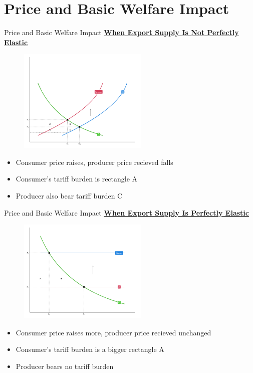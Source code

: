 \documentclass{beamer}
\begin{document}
\section{Price and Basic Welfare Impact}
\begin{frame}{Price and Basic Welfare Impact}
    \underline{\textbf{When Export Supply Is {\color{red}Not} Perfectly Elastic}}
    \begin{figure}[H]
        \centering
        \includegraphics[width=0.55\textwidth]{tariff_welfare.png}
    \end{figure}
    \begin{itemize}
        \item Consumer price {\color{red}raises,} producer price recieved {\color{red}falls}
        \item Consumer's tariff burden is rectangle A
        \item {\color{red}Producer also bear tariff burden C}
    \end{itemize}
\end{frame}

\begin{frame}{Price and Basic Welfare Impact}
    \underline{\textbf{When Export Supply {\color{red}Is Perfectly Elastic}}}
    \begin{figure}[H]
        \centering
        \includegraphics[width=0.55\textwidth]{Tariff_welfare_flat.png}
    \end{figure}
    \begin{itemize}
        \item Consumer price {\color{red}raises more,} producer price recieved {\color{red}unchanged}
        \item Consumer's tariff burden is a {\color{red}bigger} rectangle A
        \item {\color{red}Producer bears no tariff burden}
    \end{itemize}
\end{frame}
\end{document}
